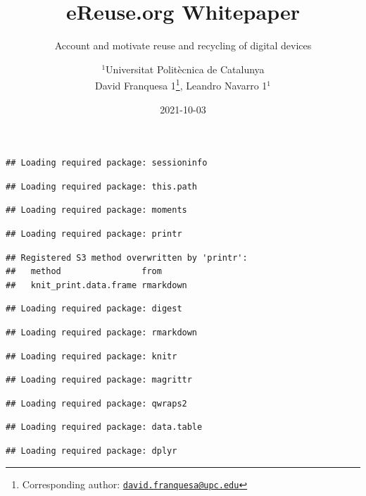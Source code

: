 \documentclass[
]{book}
\title{eReuse.org Whitepaper}
\subtitle{Account and motivate reuse and recycling of digital devices}
\author{\(^1\)Universitat Politècnica de Catalunya\\
David Franquesa 1\footnote{Corresponding author: \href{mailto:david.franquesa@upc.edu}{\nolinkurl{david.franquesa@upc.edu}}}, Leandro Navarro 1\(^1\)}
\date{2021-10-03}
\begin{document}
\maketitle

{
\setcounter{tocdepth}{1}
\tableofcontents
}
\begin{verbatim}
## Loading required package: sessioninfo
\end{verbatim}

\begin{verbatim}
## Loading required package: this.path
\end{verbatim}

\begin{verbatim}
## Loading required package: moments
\end{verbatim}

\begin{verbatim}
## Loading required package: printr
\end{verbatim}

\begin{verbatim}
## Registered S3 method overwritten by 'printr':
##   method                from     
##   knit_print.data.frame rmarkdown
\end{verbatim}

\begin{verbatim}
## Loading required package: digest
\end{verbatim}

\begin{verbatim}
## Loading required package: rmarkdown
\end{verbatim}

\begin{verbatim}
## Loading required package: knitr
\end{verbatim}

\begin{verbatim}
## Loading required package: magrittr
\end{verbatim}

\begin{verbatim}
## Loading required package: qwraps2
\end{verbatim}

\begin{verbatim}
## Loading required package: data.table
\end{verbatim}

\begin{verbatim}
## Loading required package: dplyr
\end{verbatim}
\end{document}
